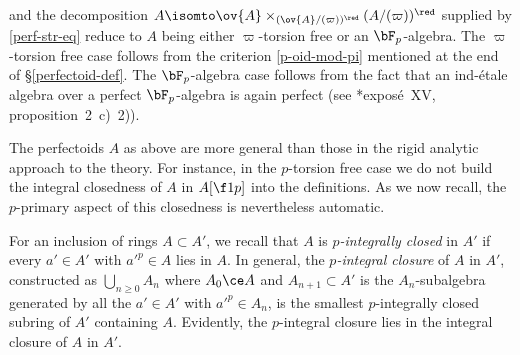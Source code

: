 \bpf
 and the decomposition $A \isomto \ov{A} \times_{(\ov{A}/(\varpi))^\red} (A/(\varpi))^\red$ supplied by \eqref{perf-str-eq} reduce to $A$ being either $\varpi$-torsion free or an $\bF_p$-algebra. The $\varpi$-torsion free case follows from the criterion \eqref{p-oid-mod-pi} mentioned at the end of \S\ref{perfectoid-def}. The $\bF_p$-algebra case follows from the fact that an ind-\'{e}tale algebra over a perfect $\bF_p$-algebra is again perfect (see \cite{SGA5}*{expos\'{e}~XV, proposition~2~c)~2)}).
\epf









The perfectoids $A$ as above are more general than those in the rigid analytic approach to the theory. For instance, in the $p$-torsion free case we do not build the integral closedness of $A$ in $A[\f 1p]$ into the definitions. As we now recall, the $p$-primary aspect of this closedness is nevertheless automatic.


 \label{p-int-cl}
For an inclusion of rings $A \subset A'$, we recall %
that $A$ is \emph{$p$-integrally closed} in $A'$ if every $a' \in A'$ with $a'^{p} \in A$ lies in $A$. In general, the \emph{$p$-integral closure} of $A$ in $A'$, constructed as $\bigcup_{n \ge 0} A_n$ where $A_0 \ce A$ and $A_{n + 1} \subset A'$ is the $A_n$-subalgebra generated by all the $a' \in A'$ with $a'^p \in A_n$, is the smallest $p$-integrally closed subring of $A'$ containing $A$. Evidently, the $p$-integral closure lies in the integral closure of $A$ in $A'$.

